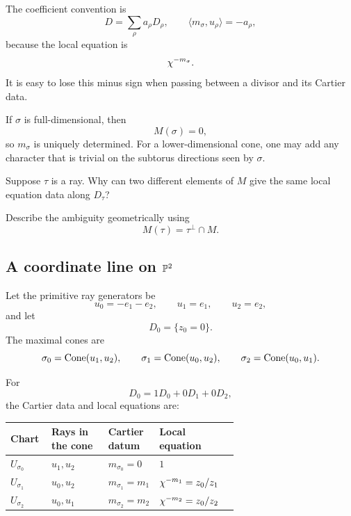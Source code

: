 \begin{warningbox}
The coefficient convention is
\[
D=\sum_\rho a_\rho D_\rho,
\qquad
\langle m_\sigma,u_\rho\rangle=-a_\rho,
\]
because the local equation is
\[
\chi^{-m_\sigma}.
\]
It is easy to lose this minus sign when passing between a divisor and
its Cartier data.
\end{warningbox}

If \(\sigma\) is full-dimensional, then
\[
M(\sigma)=0,
\]
so \(m_\sigma\) is uniquely determined. For a lower-dimensional cone,
one may add any character that is trivial on the subtorus directions
seen by \(\sigma\).

\begin{pauseandthink}
Suppose \(\tau\) is a ray. Why can two different elements of \(M\)
give the same local equation data along \(D_\tau\)?

Describe the ambiguity geometrically using
\[
M(\tau)=\tau^\perp\cap M.
\]
\end{pauseandthink}

\subsection{A coordinate line on \texorpdfstring{\(\mathbb{P}^2\)}{P2}}

Let the primitive ray generators be
\[
u_0=-e_1-e_2,
\qquad
u_1=e_1,
\qquad
u_2=e_2,
\]
and let
\[
D_0=\{z_0=0\}.
\]
The maximal cones are
\[
\sigma_0=\operatorname{Cone}(u_1,u_2),
\qquad
\sigma_1=\operatorname{Cone}(u_0,u_2),
\qquad
\sigma_2=\operatorname{Cone}(u_0,u_1).
\]

For
\[
D_0=1D_0+0D_1+0D_2,
\]
the Cartier data and local equations are:

\begin{center}
\small
\renewcommand{\arraystretch}{1.25}
\begin{tabularx}{0.92\linewidth}{@{}
  >{\raggedright\arraybackslash}p{0.18\linewidth}
  >{\raggedright\arraybackslash}p{0.25\linewidth}
  >{\raggedright\arraybackslash}p{0.22\linewidth}
  >{\raggedright\arraybackslash}X@{}}
\toprule
\textbf{Chart}
&
\textbf{Rays in the cone}
&
\textbf{Cartier datum}
&
\textbf{Local equation}
\\
\midrule
\(U_{\sigma_0}\)
&
\(u_1,u_2\)
&
\(m_{\sigma_0}=0\)
&
\(1\)
\\
\(U_{\sigma_1}\)
&
\(u_0,u_2\)
&
\(m_{\sigma_1}=m_1\)
&
\(\chi^{-m_1}=z_0/z_1\)
\\
\(U_{\sigma_2}\)
&
\(u_0,u_1\)
&
\(m_{\sigma_2}=m_2\)
&
\(\chi^{-m_2}=z_0/z_2\)
\\
\bottomrule
\end{tabularx}
\end{center}

